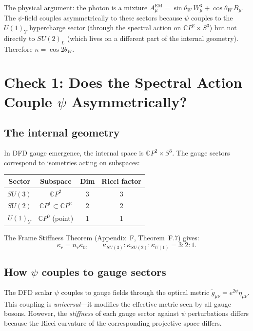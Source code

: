 \documentclass[aps,prd,twocolumn,superscriptaddress,nofootinbib]{revtex4-2}
\newcommand{\CP}{\mathbb{C}P}
\begin{document}
The physical argument: the photon is a mixture
$A_\mu^{\mathrm{EM}} = \sin\theta_W\, W^3_\mu + \cos\theta_W\, B_\mu$.
The $\psi$-field couples asymmetrically to these sectors because $\psi$
couples to the $U(1)_Y$ hypercharge sector (through the spectral action
on $\CP^2 \times S^3$) but not directly to $SU(2)_L$ (which lives on a
different part of the internal geometry).  Therefore $\kappa = \cos 2\theta_W$.


\section{Check 1: Does the Spectral Action Couple $\psi$ Asymmetrically?}
\label{sec:check1}

\subsection{The internal geometry}

In DFD gauge emergence, the internal space is $\CP^2 \times S^3$.
The gauge sectors correspond to isometries acting on subspaces:
\begin{center}
\begin{tabular}{cccc}
\toprule
Sector & Subspace & Dim & Ricci factor \\
\midrule
$SU(3)$ & $\CP^2$ & 3 & 3 \\
$SU(2)$ & $\CP^1 \subset \CP^2$ & 2 & 2 \\
$U(1)_Y$ & $\CP^0$ (point) & 1 & 1 \\
\bottomrule
\end{tabular}
\end{center}

The Frame Stiffness Theorem (Appendix~F, Theorem~F.7) gives:
\begin{equation}
\kappa_r = n_r \kappa_0, \qquad
\kappa_{SU(3)} : \kappa_{SU(2)} : \kappa_{U(1)} = 3 : 2 : 1.
\label{eq:stiffness}
\end{equation}

\subsection{How $\psi$ couples to gauge sectors}

The DFD scalar $\psi$ couples to gauge fields through the optical metric
$\tilde{g}_{\mu\nu} = e^{2\psi}\eta_{\mu\nu}$.  This coupling is
\emph{universal}---it modifies the effective metric seen by all gauge
bosons.  However, the \emph{stiffness} of each gauge sector against
$\psi$ perturbations differs because the Ricci curvature of the
corresponding projective space differs.
\end{document}
